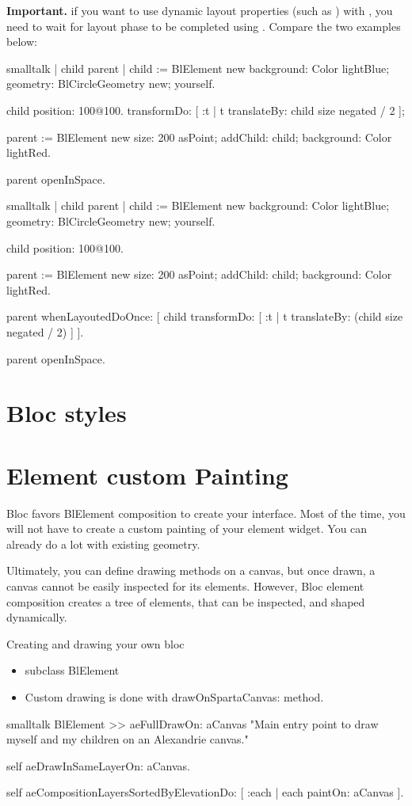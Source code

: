 \documentclass[10pt,twoside,english]{_support/latex/sbabook/sbabook}
\begin{document}
\textbf{Important.}
if you want to use dynamic layout properties (such as ) with , you need to wait for layout phase to be completed using .
Compare the two examples below:
\begin{displaycode}{smalltalk}
| child parent |
child := BlElement new 
background: Color lightBlue; 
geometry: BlCircleGeometry new;
yourself.
 
child position: 100@100.
 transformDo: [ :t | t translateBy: child size negated / 2 ];

parent := BlElement new 
size: 200 asPoint; 
addChild: child;
background: Color lightRed.

parent openInSpace.
\end{displaycode}
\begin{displaycode}{smalltalk}
| child parent |
child := BlElement new 
background: Color lightBlue; 
geometry: BlCircleGeometry new;
yourself.
 
child position: 100@100.

parent := BlElement new 
size: 200 asPoint; 
addChild: child;
background: Color lightRed.

parent whenLayoutedDoOnce: [ 
	child  transformDo: [ :t | t translateBy: (child size negated / 2) ]  ].

parent openInSpace.
\end{displaycode}

\section{Bloc styles}
\section{Element custom Painting}
Bloc favors BlElement composition to create your interface. Most of the
time, you will not have to create a custom painting of your element widget. You
can already do a lot with existing geometry.

Ultimately, you can define
drawing methods on a canvas, but once drawn, a canvas cannot be easily inspected
for its elements. However, Bloc element composition creates a tree of elements,
that can be inspected, and shaped dynamically.

Creating and drawing your own bloc

\begin{itemize}
    \item subclass BlElement
    \item Custom drawing is done with drawOnSpartaCanvas: method.
\end{itemize}
\begin{displaycode}{smalltalk}
BlElement >> aeFullDrawOn: aCanvas
	"Main entry point to draw myself and my children on an Alexandrie canvas."

	self aeDrawInSameLayerOn: aCanvas.

	self aeCompositionLayersSortedByElevationDo: [ :each | each paintOn: aCanvas ].
\end{displaycode}
\end{document}
